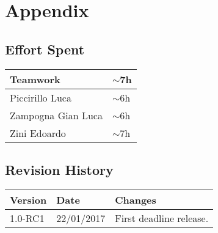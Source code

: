 \section{Appendix}


\subsection{Effort Spent}
\begin{tabular}{| p{5cm} | p{5cm} |}
\hline
Teamwork &  $\sim$7h\\
\hline
Piccirillo Luca & $\sim$6h\\
\hline
Zampogna Gian Luca & $\sim$6h\\
\hline
Zini Edoardo & $\sim$7h\\
\hline
\end{tabular}


\subsection{Revision History}
\begin{tabular}{| l | l | p{10cm} |}
\hline
\textbf{Version} & \textbf{Date} & \textbf{Changes}\\
\hline
1.0-RC1 & 22/01/2017 & First deadline release.\\
\hline
\end{tabular}